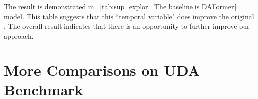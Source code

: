 The result is demonstrated in ~\cref{tab:sup_explor}.
%
The baseline is DAFormer$\ddag$ model.
%
This table suggests that this ``temporal variable" does improve the original \method.
%
The overall result indicates that there is an opportunity to further improve our approach.



\section{More Comparisons on UDA Benchmark}  \label{sec-sup:comp-uda}
%
%
